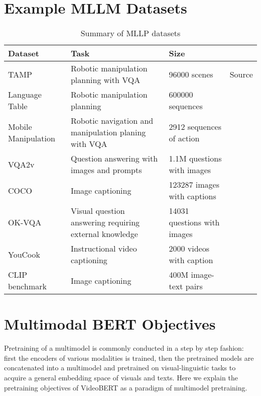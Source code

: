 \documentclass[11pt]{article}
\begin{document}

\newpage

\appendix

\section{Example MLLM Datasets}

\begin{table}[H]
    \centering
    \small
    \begin{tabular}{l|l|l|l|}
        \hline
        Dataset & Task & Size \\
        \hline
        TAMP & Robotic manipulation planning with VQA & 96000 scenes & Source\\
        Language Table & Robotic manipulation planning & 600000 sequences & \citet{DBLP:conf/icml/DriessXSLCIWTVY23}\\
        Mobile Manipulation & Robotic navigation and manipulation planing with VQA & 2912 sequences of action & \citet{DBLP:conf/icml/DriessXSLCIWTVY23}\\
        VQA2v & Question answering with images and prompts & 1.1M questions with images &\citet{DBLP:journals/ijcv/GoyalKASBP19}\\
        COCO & Image captioning & 123287 images with captions & \citet{DBLP:journals/corr/ChenFLVGDZ15}\\
        OK-VQA & Visual question answering requiring external knowledge & 14031 questions with images &\citet{DBLP:conf/cvpr/MarinoRFM19}\\
        YouCook & Instructional video captioning & 2000 videos with caption & \citet{DBLP:conf/iccv/SunMV0S19}\\
        CLIP benchmark & Image captioning & 400M image-text pairs & \citet{DBLP:conf/icml/RadfordKHRGASAM21}\\
        \hline
    \end{tabular}
    \caption{Summary of MLLP datasets}
    \onecolumn
\end{table}

\twocolumn
\section{Multimodal BERT Objectives}
\label{sec:appendix}
Pretraining of a multimodel is commonly conducted in a step by step fashion: first the encoders of various modalities is trained, then the pretrained models are concatenated into a multimodel and pretrained on visual-linguistic tasks to acquire a general embedding space of visuals and texts. Here we explain the pretraining objectives of VideoBERT \citep{DBLP:conf/iccv/SunMV0S19} as a paradigm of multimodel pretraining. 
\end{document}
